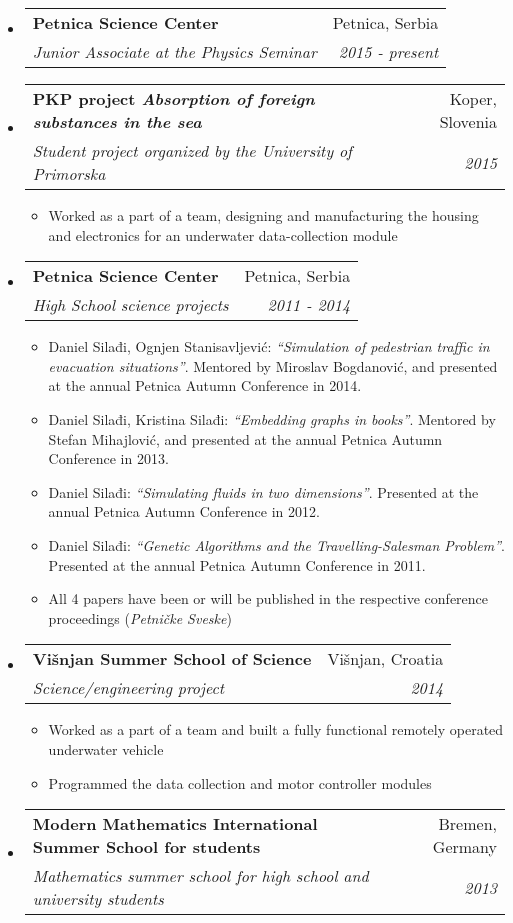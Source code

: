 \documentclass[a4paper]{article}
\makeatletter
\newcommand{\ressubheading}[4]{
\begin{tabular*}{6.5in}{l@{\cftdotfill{\cftsecdotsep}\extracolsep{\fill}}r}
		\textbf{#1} & #2 \\
		\textit{#3} & \textit{#4} \\
\end{tabular*}\vspace{-2pt}}
\makeatother
\begin{document}
\begin{itemize}
	\item \ressubheading{Petnica Science Center}{Petnica, Serbia}{Junior Associate at the Physics Seminar}{2015 - present}
	\item \ressubheading{PKP project \emph{Absorption of foreign substances in the sea}}{Koper, Slovenia}{Student project organized by the University of Primorska}{2015}
	\begin{itemize}
		\item Worked as a part of a team, designing and manufacturing the housing and electronics for an underwater data-collection module
	\end{itemize}
	\item \ressubheading{Petnica Science Center}{Petnica, Serbia}{High School science projects}{2011 - 2014}
	\begin{itemize}
		\item Daniel Silađi, Ognjen Stanisavljević: \emph{``Simulation of pedestrian traffic in evacuation situations''}. Mentored by Miroslav Bogdanović, and presented at the annual Petnica Autumn Conference in 2014.
		\item Daniel Silađi, Kristina Silađi: \emph{``Embedding graphs in books''}. Mentored by Stefan Mihajlović, and presented at the annual Petnica Autumn Conference in 2013.
		\item Daniel Silađi: \emph{``Simulating fluids in two dimensions''}. Presented at the annual Petnica Autumn Conference in 2012.
		\item Daniel Silađi: \emph{``Genetic Algorithms and the Travelling-Salesman Problem''}. Presented at the annual Petnica Autumn Conference in 2011.
		\item All 4 papers have been or will be published in the respective conference proceedings (\emph{Petničke Sveske})
	\end{itemize}
	\item \ressubheading{Višnjan Summer School of Science}{Višnjan, Croatia}{Science/engineering project}{2014}
	\begin{itemize}
		\item Worked as a part of a team and built a fully functional remotely operated underwater vehicle
		\item Programmed the data collection and motor controller modules 
	\end{itemize}
	\item \ressubheading{Modern Mathematics International Summer School for students}{Bremen, Germany}{Mathematics summer school for high school and university students}{2013}
\end{itemize}
\end{document}
